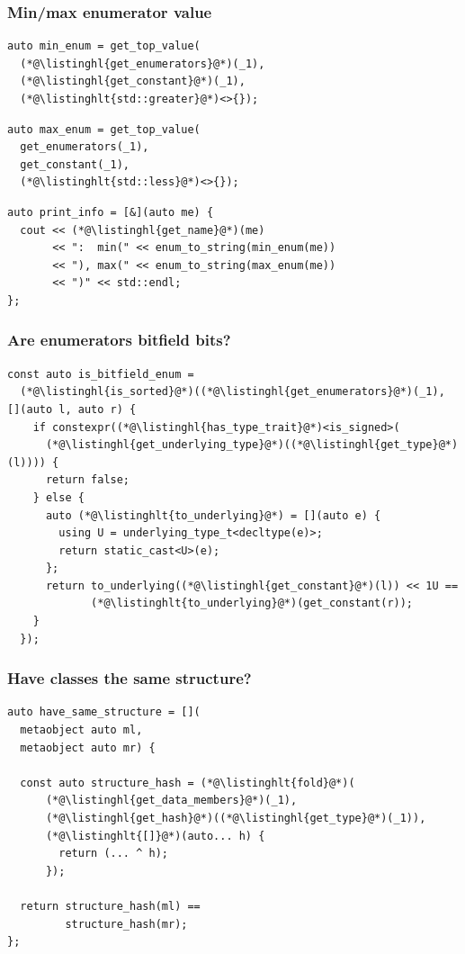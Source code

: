\documentclass[compress,table,xcolor=table]{beamer}
\begin{document}
\begin{frame}[fragile]
  \frametitle{Min/max enumerator value}
  \begin{lstlisting}[language=c++2x,basicstyle=\footnotesize\ttfamily]
auto min_enum = get_top_value(
  (*@\listinghl{get_enumerators}@*)(_1),
  (*@\listinghl{get_constant}@*)(_1),
  (*@\listinghlt{std::greater}@*)<>{});
  \end{lstlisting}
  \vfill
  \begin{lstlisting}[language=c++2x,basicstyle=\footnotesize\ttfamily]
auto max_enum = get_top_value(
  get_enumerators(_1),
  get_constant(_1),
  (*@\listinghlt{std::less}@*)<>{});
  \end{lstlisting}
  \vfill
  \begin{lstlisting}[language=c++2x,basicstyle=\footnotesize\ttfamily]
auto print_info = [&](auto me) {
  cout << (*@\listinghl{get_name}@*)(me)
       << ":  min(" << enum_to_string(min_enum(me))
       << "), max(" << enum_to_string(max_enum(me))
       << ")" << std::endl;
};
  \end{lstlisting}
\end{frame}
\begin{frame}[fragile]
  \frametitle{Are enumerators bitfield bits?}
  \begin{lstlisting}[language=c++2x,basicstyle=\footnotesize\ttfamily]
const auto is_bitfield_enum =
  (*@\listinghl{is_sorted}@*)((*@\listinghl{get_enumerators}@*)(_1), [](auto l, auto r) {
    if constexpr((*@\listinghl{has_type_trait}@*)<is_signed>(
      (*@\listinghl{get_underlying_type}@*)((*@\listinghl{get_type}@*)(l)))) {
      return false;
    } else {
      auto (*@\listinghlt{to_underlying}@*) = [](auto e) {
        using U = underlying_type_t<decltype(e)>;
        return static_cast<U>(e);
      };
      return to_underlying((*@\listinghl{get_constant}@*)(l)) << 1U ==
             (*@\listinghlt{to_underlying}@*)(get_constant(r));
    }
  });
  \end{lstlisting}
\end{frame}
\begin{frame}[fragile]
  \frametitle{Have classes the same structure?}
  \begin{lstlisting}[language=c++2x]
auto have_same_structure = [](
  metaobject auto ml,
  metaobject auto mr) {

  const auto structure_hash = (*@\listinghlt{fold}@*)(
      (*@\listinghl{get_data_members}@*)(_1),
      (*@\listinghl{get_hash}@*)((*@\listinghl{get_type}@*)(_1)),
      (*@\listinghlt{[]}@*)(auto... h) {
        return (... ^ h);
      });

  return structure_hash(ml) ==
         structure_hash(mr);
};
  \end{lstlisting}
\end{frame}
\end{document}
